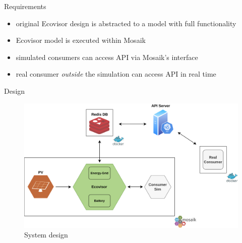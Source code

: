 \begin{frame}{Requirements}
    \begin{center}
        \begin{minipage}{.5\textwidth}
            \begin{itemize}
                \item original Ecovisor design is abstracted to a model with
                    full functionality
                \item Ecovisor model is executed within Mosaik
                \item simulated consumers can access API via Mosaik's interface
                \item real consumer \emph{outside} the simulation can access API
                    in real time
            \end{itemize}
        \end{minipage}
    \end{center}
\end{frame}

\begin{frame}{Design}
    \begin{figure}
    \centering
    \includegraphics[height=.68\textheight]{../../system_design}
    \caption{System design}
    \label{fig:system_design}
    \end{figure}
\end{frame}
